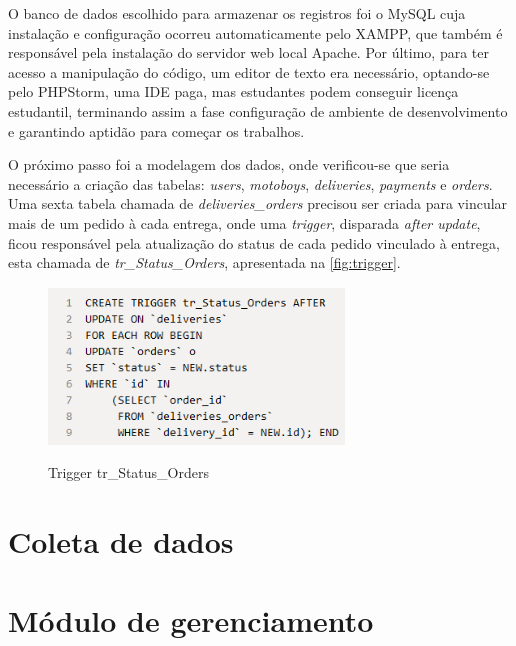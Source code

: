 O banco de dados escolhido para armazenar os registros foi o MySQL cuja instalação e configuração ocorreu automaticamente pelo XAMPP, que também é responsável pela instalação do servidor web local Apache. Por último, para ter acesso a manipulação do código, um editor de texto era necessário, optando-se pelo PHPStorm, uma IDE paga, mas estudantes podem conseguir licença estudantil, terminando assim a fase configuração de ambiente de desenvolvimento e garantindo aptidão para começar os trabalhos.

O próximo passo foi a modelagem dos dados, onde verificou-se que seria necessário a criação das tabelas: \textit{users}, \textit{motoboys}, \textit{deliveries}, \textit{payments} e \textit{orders}. Uma sexta tabela chamada de \textit{deliveries\_orders} precisou ser criada para vincular mais de um pedido à cada entrega, onde uma \textit{trigger}, disparada \textit{after update}, ficou responsável pela atualização do status de cada pedido vinculado à entrega, esta chamada de \textit{tr\_Status\_Orders}, apresentada na \autoref{fig:trigger}.

\begin{figure}[H]
    \centering
    \caption{Trigger tr\_Status\_Orders}
    \includegraphics[width=0.7\textwidth]{./dados/figuras/fig7}
    \label{fig:trigger}
\end{figure}

 
\section{Coleta de dados}

\section{Módulo de gerenciamento}

